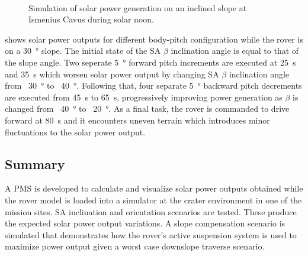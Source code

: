 \begin{figure}[h]
\begin{subfigure}[t]{\subfigureWidth}
		\label{fig:sub:rover-slope-compensation-power-profile}
	\end{subfigure}\\[0.8ex]
    \caption[Simulation of solar power generation on an inclined slope]
            {Simulation of solar power generation on an inclined slope at Ismenius Cavus during solar noon.}
    \label{fig:rover-slope-compensation}
\vspace{-2ex}
\end{figure}

\clearpage

 shows solar power outputs for different body-pitch configuration while the rover is on a \SI{30}{\degree} slope. The initial state of the \ac{SA} $\beta$ inclination angle is equal to that of the slope angle. Two seperate \SI{5}{\degree} forward pitch increments are executed at \SI{25}{\second} and \SI{35}{\second} which worsen solar power output by changing \ac{SA} $\beta$ inclination angle from ~\SI{30}{\degree} to ~\SI{40}{\degree}. Following that, four separate \SI{5}{\degree} backward pitch decrements are executed from \SI{45}{\second} to \SI{65}{\second}, progressively improving power generation as $\beta$ is changed from ~\SI{40}{\degree} to ~\SI{20}{\degree}. As a final task, the rover is commanded to drive forward at \SI{80}{\second} and it encounters uneven terrain which introduces minor fluctuations to the solar power output.

\subsection{Summary}
A \ac{PMS} is developed to calculate and visualize solar power outputs obtained while the rover model is loaded into a simulator at the crater environment in one of the mission sites. \ac{SA} inclination and orientation scenarios are tested. These produce the expected solar power output variations. A slope compensation scenario is simulated that demonstrates how the rover's active suspension system is used to maximize power output given a worst case downslope traverse scenario.
